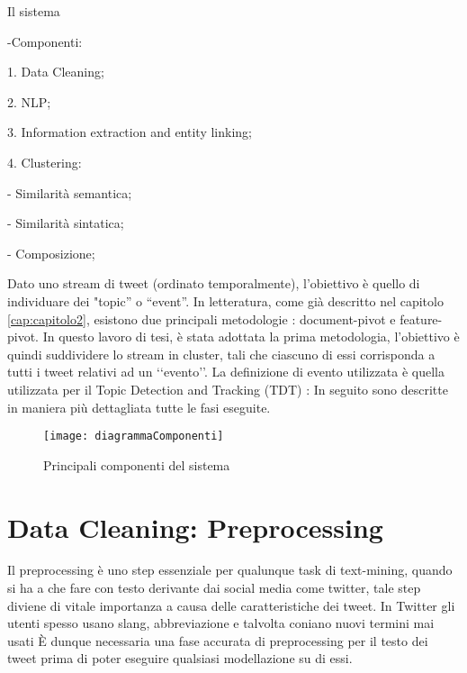 

\color{red}
Il sistema

-Componenti:

1. Data Cleaning;

2. NLP;

3. Information extraction and entity linking;

4. Clustering:

	- Similarità semantica;
	
    - Similarità sintatica;
   
    - Composizione;
 			

\color{black}

Dato uno stream  di tweet (ordinato temporalmente), l'obiettivo  è quello di individuare dei "topic” o “event”. In letteratura, come già descritto nel capitolo \ref{cap:capitolo2}, esistono due principali metodologie : document-pivot e feature-pivot.
In questo lavoro di tesi, è stata adottata la prima metodologia, l'obiettivo è quindi suddividere lo stream in cluster, tali che ciascuno di essi corrisponda a tutti i tweet relativi ad un \lq\lq evento\rq\rq.  
La definizione di evento utilizzata è quella utilizzata per il Topic Detection and Tracking (TDT) \cite{Allan:2002:TDT:772260} :
In seguito sono descritte in maniera più dettagliata tutte le fasi eseguite.

\begin{figure}[h]
    \centering
    \texttt{[image: diagrammaComponenti]}
    \caption{Principali componenti del sistema}
    \label{fig:diagrammaComponentiSistema}
\end{figure} 


\section{Data Cleaning: Preprocessing}

Il preprocessing è uno step essenziale per qualunque task di text-mining, quando si ha a che fare con testo derivante dai social media come twitter, tale step diviene di vitale importanza a causa delle caratteristiche dei tweet. In Twitter gli utenti spesso usano slang, abbreviazione e talvolta coniano nuovi termini mai usati 
\`E dunque necessaria una fase accurata di preprocessing per il testo dei tweet prima di poter eseguire qualsiasi modellazione su di essi. 

